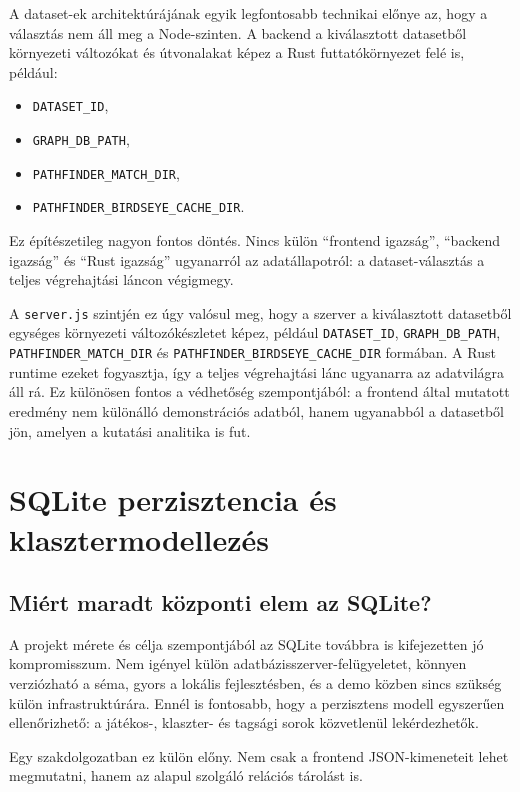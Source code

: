 ﻿\documentclass[a4paper,12pt]{report}
\begin{document}
A dataset-ek architektúrájának egyik legfontosabb technikai előnye az, hogy a választás nem áll meg a Node-szinten. A backend a kiválasztott datasetből környezeti változókat és útvonalakat képez a Rust futtatókörnyezet felé is, például:

\begin{itemize}
    \item \texttt{DATASET\_ID},
    \item \texttt{GRAPH\_DB\_PATH},
    \item \texttt{PATHFINDER\_MATCH\_DIR},
    \item \texttt{PATHFINDER\_BIRDSEYE\_CACHE\_DIR}.
\end{itemize}

Ez építészetileg nagyon fontos döntés. Nincs külön ``frontend igazság'', ``backend igazság'' és ``Rust igazság'' ugyanarról az adatállapotról: a dataset-választás a teljes végrehajtási láncon végigmegy.

A \texttt{server.js} szintjén ez úgy valósul meg, hogy a szerver a kiválasztott datasetből egységes környezeti változókészletet képez, például \texttt{DATASET\_ID}, \texttt{GRAPH\_DB\_PATH}, \texttt{PATHFINDER\_MATCH\_DIR} és \texttt{PATHFINDER\_BIRDSEYE\_CACHE\_DIR} formában. A Rust runtime ezeket fogyasztja, így a teljes végrehajtási lánc ugyanarra az adatvilágra áll rá. Ez különösen fontos a védhetőség szempontjából: a frontend által mutatott eredmény nem különálló demonstrációs adatból, hanem ugyanabból a datasetből jön, amelyen a kutatási analitika is fut.

\chapter{SQLite perzisztencia és klasztermodellezés}

\section{Miért maradt központi elem az SQLite?}

A projekt mérete és célja szempontjából az SQLite továbbra is kifejezetten jó kompromisszum. Nem igényel külön adatbázisszerver-felügyeletet, könnyen verziózható a séma, gyors a lokális fejlesztésben, és a demo közben sincs szükség külön infrastruktúrára. Ennél is fontosabb, hogy a perzisztens modell egyszerűen ellenőrizhető: a játékos-, klaszter- és tagsági sorok közvetlenül lekérdezhetők.

Egy szakdolgozatban ez külön előny. Nem csak a frontend JSON-kimeneteit lehet megmutatni, hanem az alapul szolgáló relációs tárolást is.
\end{document}
